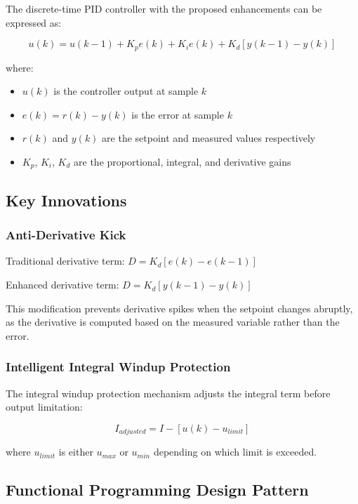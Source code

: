\documentclass{article}
\begin{document}
The discrete-time PID controller with the proposed enhancements can be expressed as:

\begin{equation}
u(k) = u(k-1) + K_p e(k) + K_i e(k) + K_d [y(k-1) - y(k)]
\end{equation}

where:
\begin{itemize}
    \item $u(k)$ is the controller output at sample $k$
    \item $e(k) = r(k) - y(k)$ is the error at sample $k$
    \item $r(k)$ and $y(k)$ are the setpoint and measured values respectively
    \item $K_p$, $K_i$, $K_d$ are the proportional, integral, and derivative gains
\end{itemize}

\subsection{Key Innovations}

\subsubsection{Anti-Derivative Kick}

Traditional derivative term: $D = K_d[e(k) - e(k-1)]$

Enhanced derivative term: $D = K_d[y(k-1) - y(k)]$

This modification prevents derivative spikes when the setpoint changes abruptly, as the derivative is computed based on the measured variable rather than the error.

\subsubsection{Intelligent Integral Windup Protection}

The integral windup protection mechanism adjusts the integral term before output limitation:

\begin{equation}
I_{adjusted} = I - [u(k) - u_{limit}]
\end{equation}

where $u_{limit}$ is either $u_{max}$ or $u_{min}$ depending on which limit is exceeded.

\subsection{Functional Programming Design Pattern}
\end{document}
